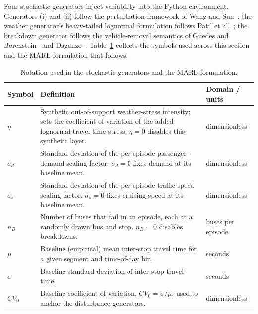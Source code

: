 Four stochastic generators inject variability into the Python environment. Generators (i) and (ii) follow the perturbation framework of Wang and Sun~\cite{Wangsun}; the weather generator's heavy-tailed lognormal formulation follows Patil et al.~\cite{Patil2025Conformal}; the breakdown generator follows the vehicle-removal semantics of Guedes and Borenstein~\cite{Guedes2018Rescheduling} and Daganzo~\cite{Daganzo2009}. Table~\ref{tab:notation} collects the symbols used across this section and the MARL formulation that follows.


\begin{table}[htbp]
\centering
\caption{Notation used in the stochastic generators and the MARL formulation.}
\label{tab:notation}

\small
\renewcommand{\arraystretch}{1.25}

\begin{tabularx}{\textwidth}{
>{\RaggedRight\arraybackslash}p{}
>{\RaggedRight\arraybackslash}X
>{\RaggedRight\arraybackslash}p{}
}

\toprule
\textbf{Symbol} & \textbf{Definition} & \textbf{Domain / units} \\
\midrule

$\eta$ &
Synthetic out-of-support weather-stress intensity; sets the coefficient of variation of the added lognormal travel-time stress. $\eta=0$ disables this synthetic layer. &
dimensionless \\

$\sigma_d$ &
Standard deviation of the per-episode passenger-demand scaling factor. $\sigma_d=0$ fixes demand at its baseline mean. &
dimensionless \\

$\sigma_s$ &
Standard deviation of the per-episode traffic-speed scaling factor. $\sigma_s=0$ fixes cruising speed at its baseline mean. &
dimensionless \\

$n_B$ &
Number of buses that fail in an episode, each at a randomly drawn bus and stop. $n_B=0$ disables breakdowns. &
buses per episode \\

$\mu$ &
Baseline (empirical) mean inter-stop travel time for a given segment and time-of-day bin. &
seconds \\

$\sigma$ &
Baseline standard deviation of inter-stop travel time. &
seconds \\

$CV_0$ &
Baseline coefficient of variation, $CV_0=\sigma/\mu$, used to anchor the disturbance generators. &
dimensionless \\


\end{tabularx}
\end{table}
